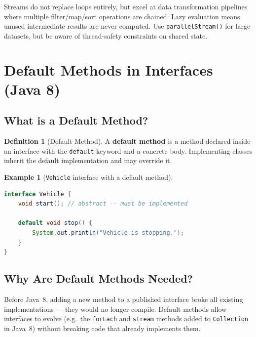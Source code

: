 \documentclass[11pt, a4paper, notitlepage]{report}
\theoremstyle{definition}
\newtheorem{definition}[theorem]{Definition}
\theoremstyle{remark}
\theoremstyle{definition}
\newtheorem{example}[theorem]{Example}
\begin{document}
\begin{keyresult}[title={Key Result: Streams vs.\ Loops}]
Streams do not replace loops entirely, but excel at data transformation pipelines
where multiple filter/map/sort operations are chained.  Lazy evaluation means unused
intermediate results are never computed.  Use \texttt{parallelStream()} for large
datasets, but be aware of thread-safety constraints on shared state.
\end{keyresult}

\section{Default Methods in Interfaces (Java 8)}
\label{sec:ch10-default-methods}

\subsection{What is a Default Method?}
\label{subsec:ch10-default-what}

\begin{definition}[Default Method]
\label{def:ch10-default}
A \textbf{default method} is a method declared inside an interface with the
\texttt{default} keyword and a concrete body.  Implementing classes inherit the
default implementation and may override it.
\end{definition}

\begin{example}[\texttt{Vehicle} interface with a default method]
\leavevmode
\begin{lstlisting}[language=Java]
interface Vehicle {
    void start(); // abstract -- must be implemented

    default void stop() {
        System.out.println("Vehicle is stopping.");
    }
}
\end{lstlisting}
\end{example}

\subsection{Why Are Default Methods Needed?}
\label{subsec:ch10-default-why}

Before Java~8, adding a new method to a published interface broke all existing
implementations --- they would no longer compile.  Default methods allow interfaces
to evolve (e.g.\ the \texttt{forEach} and \texttt{stream} methods added to
\texttt{Collection} in Java~8) without breaking code that already implements them.
\end{document}
